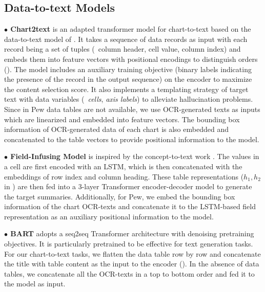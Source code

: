 \subsection{Data-to-text Models} \label{subsec:data2text}



\vspace{0.5em}
\textbf{$\bullet$ Chart2text}
\cite{obeid} 
is an adapted transformer model for chart-to-text based on the data-to-text model of  \citet{gong-etal-2019-enhanced}. It takes a sequence of data records as input with each record being a set of tuples (\eg\ column header, cell value, column index) and embeds them into feature vectors with positional encodings to distinguish orders (). The model includes an auxiliary training objective (binary labels indicating the presence of the record in the output sequence) on the encoder to maximize the content selection score. It also implements a  templating strategy of target text with data variables (\eg\
\emph{cells}, \emph{axis labels}) to alleviate hallucination problems. Since in Pew data tables are not available,
we use OCR-generated texts as inputs  which are linearized and embedded into feature vectors. 
The bounding box information of OCR-generated data of each chart is also embedded and concatenated to the table vectors to provide positional information to the model. 

 

\vspace{0.5em}
\noindent \textbf{$\bullet$ Field-Infusing Model}
\cite{chen2020logical}
is inspired by the concept-to-text work \cite{lebret-etal-2016-neural}. The values in a cell are first encoded with an LSTM, which is then concatenated with the embeddings of row index and column heading. These table representations ($h_1, h_2$ in ) are then fed into a 3-layer Transformer encoder-decoder model to generate the target summaries. Additionally, for Pew, 
we embed the bounding box information of the chart OCR-texts and concatenate it to the LSTM-based field representation as an auxiliary positional information to the model.






\vspace{0.5em}
\noindent  \textbf{$\bullet$ BART}
\cite{lewis-etal-2020-bart} 
adopts a seq2seq Transformer architecture with  denoising pretraining  objectives. It is particularly pretrained to be effective  for text generation tasks. 
For our chart-to-text tasks, 
we flatten the data table row by row and concatenate  the title with table content as the input to the encoder (). {In the absence of data tables, we concatenate all the OCR-texts in a top to bottom order and fed it to the model as input.} 

